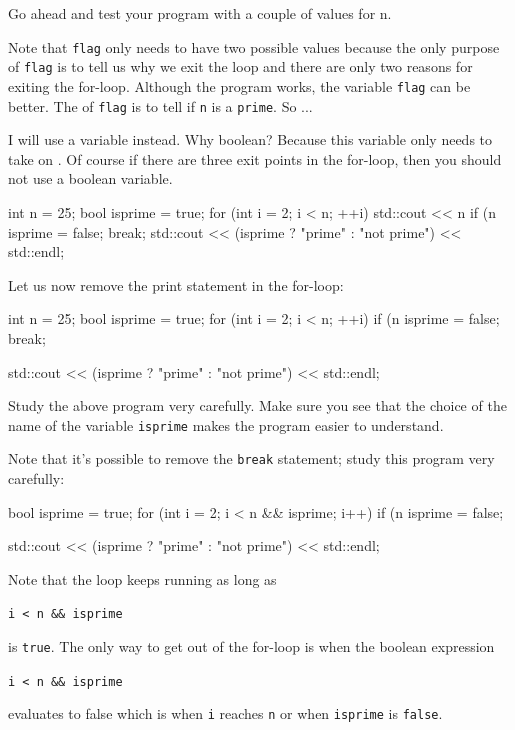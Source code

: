 Go ahead and test your program with a couple of values for n.

Note that \texttt{flag} only needs to have two possible values because the
only purpose of \texttt{flag} is to tell us why we exit the loop and there
are only two reasons for exiting the for-loop. Although the program
works, the variable  \texttt{flag} can be better. The
 of \texttt{flag} is to tell if \texttt{n} is a
\texttt{prime}. So ...

I will use a \texttt{} variable \texttt{}
instead. Why boolean? Because this variable only needs to take on
. Of course if there are three exit points
in the for-loop, then you should not use a boolean variable.
\begin{console}
int n = 25;
bool isprime = true;
for (int i = 2; i < n; ++i)
{   
    std::cout << n %
    if (n %
    {  
        isprime = false;
        break;
    }
}
std::cout << (isprime ? "prime" : "not prime") << std::endl;
\end{console}
Let us now remove the print statement in the for-loop:
\begin{console}
int n = 25;
bool isprime = true;
for (int i = 2; i < n; ++i)
{   
    if (n %
    {
        isprime = false;
        break;
    }
}

std::cout << (isprime ? "prime" : "not prime")
          << std::endl;
\end{console}
Study the above program very carefully. Make sure you see that the
choice of the name of the variable \texttt{isprime} makes the program
easier to understand.

Note that it's possible to remove the \texttt{break}
statement; study this program very carefully:
\begin{console}
bool isprime = true;
for (int i = 2; i < n && isprime; i++)
{   
    if (n %
    {
        isprime = false;
    }
}

std::cout << (isprime ? "prime" : "not prime")
          << std::endl;
\end{console}

Note that the loop keeps running as long as
\begin{center}
\texttt{i < n \&\& isprime}
\end{center}
is \texttt{true}. The only way to get out of the for-loop is when the
boolean expression
\begin{center}
\texttt{i < n \&\& isprime}
\end{center}
evaluates to false which is when \texttt{i} reaches \texttt{n} or when
\texttt{isprime} is \texttt{false}.

